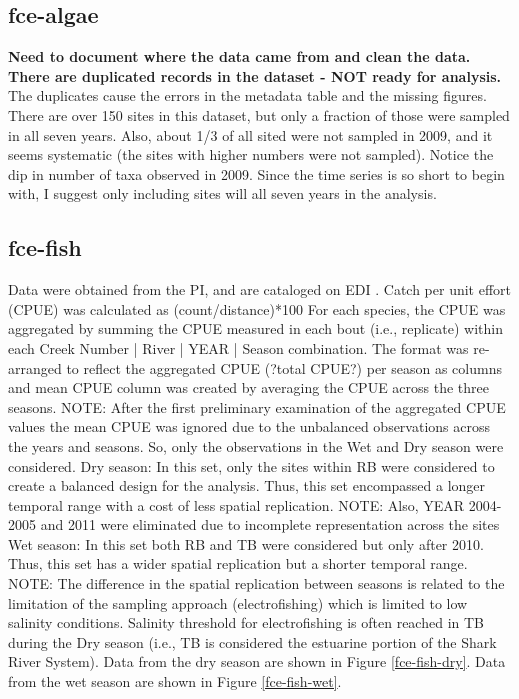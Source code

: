 \documentclass[11pt, oneside]{article}
\begin{document}
\subsection {fce-algae}
{\bf Need to document where the data came from and clean the data.}
{\bf There are duplicated records in the dataset - NOT ready for analysis.}
The duplicates cause the errors in the metadata table and the missing figures.
There are over 150 sites in this dataset, but only a fraction of those were sampled in all seven years.
Also, about 1/3 of all sited were not sampled in 2009, and it seems systematic (the sites with higher numbers were not sampled).
Notice the dip in number of taxa observed in 2009.
Since the time series is so short to begin with, I suggest only including sites will all seven years in the analysis.


\subsection {fce-fish}
Data were obtained from the PI, and are cataloged on EDI  \citep{fce-fish}.
Catch per unit effort (CPUE) was calculated as (count/distance)*100
For each species, the CPUE was aggregated by summing the CPUE measured in each bout (i.e., replicate) within each Creek Number | River | YEAR | Season combination.
The format was re-arranged to reflect the aggregated CPUE (?total CPUE?) per season as columns and mean CPUE column was created by averaging the CPUE across the three seasons.
NOTE: After the first preliminary examination of the aggregated CPUE values the mean CPUE was ignored due to the unbalanced observations across the years and seasons. 
So, only the observations in the Wet and Dry season were considered.
Dry season: In this set, only the sites within RB were considered to create a balanced design for the analysis. 
Thus, this set encompassed a longer temporal range with a cost of less spatial replication.
NOTE: Also, YEAR 2004-2005 and 2011 were eliminated due to incomplete representation across the sites
Wet season: In this set both RB and TB were considered but only after 2010. Thus, this set has a wider spatial replication but a shorter temporal range.
NOTE: The difference in the spatial replication between seasons is related to the limitation of the sampling approach (electrofishing) which is limited to low salinity conditions. 
Salinity threshold for electrofishing is often reached in TB during the Dry season (i.e., TB is considered the estuarine portion of the Shark River System).
Data from the dry season are shown in Figure \ref{fce-fish-dry}.
Data from the wet season are shown in Figure \ref{fce-fish-wet}.
\end{document}
